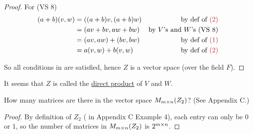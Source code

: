 \begin{proof}
For (VS 8)
\begin{align*}
    (a + b)(v, w) & = ((a + b)v , (a + b)w) & \text{by def of \MAROON{(2)}} \\
                               & = (av + bv, aw + bw) & \text{by \(V\)'s and \(W\)'s (VS 8)} \\
                               & = (av, aw) + (bv, bw) & \text{by def of \MAROON{(1)}} \\
                               & = a(v, w) + b(v, w) & \text{by def of \MAROON{(2)}}
\end{align*}

So all conditions in  are satisfied, hence \(Z\) is a vector space (over the field \(F\)).
\end{proof}

\begin{note}
It seems that \(Z\) is called the \href{https://www.wikiwand.com/en/Direct_product}{direct product} of \(V\) and \(W\).
\end{note}

\begin{exercise} \label{exercise 1.2.22}
How many matrices are there in the vector space \(M_{m \times n}(Z_2)\)? (See Appendix C.)
\end{exercise}

\begin{proof}
By definition of \(Z_2\) (\TODOREF{} in Appendix C Example 4), each entry can only be \(0\) or \(1\), so the number of matrices in \(M_{m \times n}(Z_2)\) is \(2^{m \times n}\).
\end{proof}